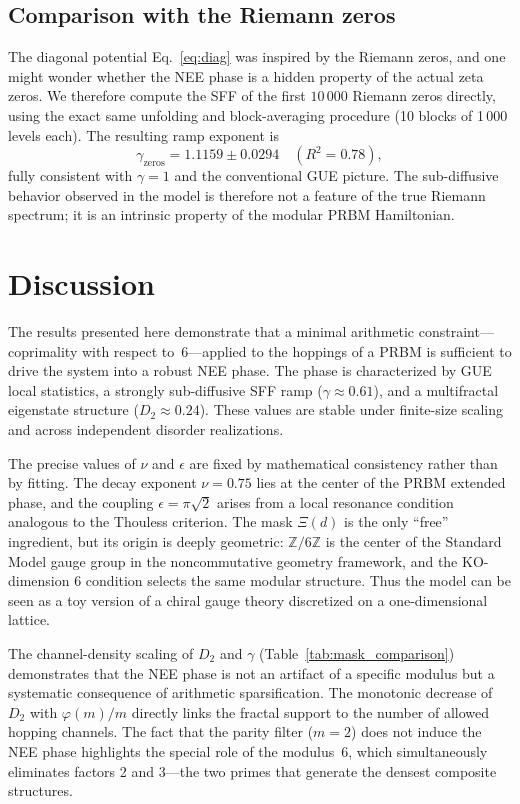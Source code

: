 \documentclass[aps,prl,preprint,superscriptaddress,floatfix]{revtex4-2}
\begin{document}
\subsection{Comparison with the Riemann zeros}

The diagonal potential Eq.~\eqref{eq:diag} was inspired by the Riemann zeros, and one might wonder whether the NEE phase is a hidden property of the actual zeta zeros. We therefore compute the SFF of the first $10\,000$ Riemann zeros directly, using the exact same unfolding and block-averaging procedure (10 blocks of 1\,000 levels each). The resulting ramp exponent is
\begin{equation}
\gamma_{\text{zeros}} = 1.1159 \pm 0.0294 \quad (R^2=0.78),
\end{equation}
fully consistent with $\gamma=1$ and the conventional GUE picture. The sub-diffusive behavior observed in the model is therefore not a feature of the true Riemann spectrum; it is an intrinsic property of the modular PRBM Hamiltonian.

\section{Discussion}
\label{sec:discussion}

The results presented here demonstrate that a minimal arithmetic constraint---coprimality with respect to~6---applied to the hoppings of a PRBM is sufficient to drive the system into a robust NEE phase. The phase is characterized by GUE local statistics, a strongly sub-diffusive SFF ramp ($\gamma\approx0.61$), and a multifractal eigenstate structure ($D_2\approx0.24$). These values are stable under finite-size scaling and across independent disorder realizations.

The precise values of $\nu$ and $\epsilon$ are fixed by mathematical consistency rather than by fitting. The decay exponent $\nu=0.75$ lies at the center of the PRBM extended phase, and the coupling $\epsilon=\pi\sqrt{2}$ arises from a local resonance condition analogous to the Thouless criterion. The mask $\Xi(d)$ is the only ``free'' ingredient, but its origin is deeply geometric: $\mathbb{Z}/6\mathbb{Z}$ is the center of the Standard Model gauge group in the noncommutative geometry framework, and the KO-dimension 6 condition selects the same modular structure. Thus the model can be seen as a toy version of a chiral gauge theory discretized on a one-dimensional lattice.

The channel-density scaling of $D_2$ and $\gamma$ (Table~\ref{tab:mask_comparison}) demonstrates that the NEE phase is not an artifact of a specific modulus but a systematic consequence of arithmetic sparsification. The monotonic decrease of $D_2$ with $\varphi(m)/m$ directly links the fractal support to the number of allowed hopping channels. The fact that the parity filter ($m=2$) does not induce the NEE phase highlights the special role of the modulus~6, which simultaneously eliminates factors 2 and 3---the two primes that generate the densest composite structures.
\end{document}
